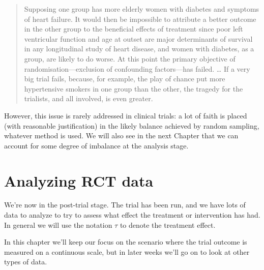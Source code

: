 \documentclass[
  openany]{book}
\theoremstyle{definition}
\theoremstyle{definition}
\theoremstyle{definition}
\theoremstyle{definition}
\theoremstyle{remark}
\begin{document}
\begin{quote}
Supposing one group has more elderly women with diabetes and symptoms of heart failure. It would then be impossible to attribute a better outcome in the other group to the beneficial effects of treatment since poor left ventricular function and age at outset are major determinants of survival in any longitudinal study of heart disease, and women with diabetes, as a group, are likely to do worse. At this point the primary objective of randomisation---exclusion of confounding factors---has failed. \ldots{} If a very big trial fails, because, for example, the play of chance put more hypertensive smokers in one group than the other, the tragedy for the trialists, and all involved, is even greater.
\end{quote}

However, this issue is rarely addressed in clinical trials: a lot of faith is placed (with reasonable justification) in the likely balance achieved by random sampling, whatever method is used. We will also see in the next Chapter that we can account for some degree of imbalance at the analysis stage.

\chapter{Analyzing RCT data}\label{rct-analysis}

We're now in the post-trial stage. The trial has been run, and we have lots of data to analyze to try to assess what effect the treatment or intervention has had. In general we will use the notation \(\tau\) to denote the treatment effect.

In this chapter we'll keep our focus on the scenario where the trial outcome is measured on a continuous scale, but in later weeks we'll go on to look at other types of data.
\end{document}
